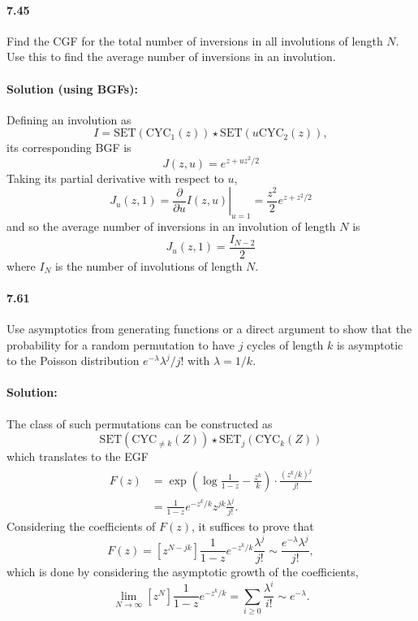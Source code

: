 \documentclass{article}
\begin{document}
\paragraph{7.45} Find the CGF for the total number of inversions in all
involutions of length $N$. Use this to find the average number of inversions in
an involution.

\paragraph{Solution (using BGFs):} Defining an involution as \begin{equation*}
  I = \mathrm{SET}(\mathrm{CYC}_1(z)) \star \mathrm{SET}(u\mathrm{CYC}_2(z)),
\end{equation*} its corresponding BGF is \begin{equation*}
  J(z, u) = e^{z + uz^2/2}
\end{equation*} Taking its partial derivative with respect to $u$,
\begin{equation*}
  J_u(z, 1) = \left.\frac{\partial}{\partial u}I(z, u)\right|_{u = 1} =
  \frac{z^2}{2} e^{z + z^2/2}
\end{equation*} and so the average number of inversions in an involution of
length $N$ is \begin{equation*}
  [z^N]J_u(z, 1) = \frac{I_{N - 2}}{2}
\end{equation*} where $I_N$ is the number of involutions of length $N$.

\paragraph{7.61} Use asymptotics from generating functions or a direct argument
to show that the probability for a random permutation to have $j$ cycles of
length $k$ is asymptotic to the Poisson distribution $e^{-\lambda}\lambda^j/j!$
with $\lambda = 1/k$.

\paragraph{Solution:} The class of such permutations can be constructed as
\begin{equation*}
  \mathrm{SET}(\mathrm{CYC}_{\neq k}(Z)) \star
  \mathrm{SET}_j(\mathrm{CYC}_k(Z))
\end{equation*} which translates to the EGF \begin{align*}
  F(z) &= \exp\left(\log\frac{1}{1 - z} - \frac{z^k}{k}\right) \cdot
  \frac{(z^k/k)^j}{j!} \\
       &= \frac{1}{1 - z}e^{-z^k/k}z^{jk}\frac{\lambda^j}{j!}.
\end{align*} Considering the coefficients of $F(z)$, it suffices to prove that
\begin{equation*}
  [z^N]F(z) = [z^{N - jk}]\frac{1}{1 - z}e^{-z^k/k}\frac{\lambda^j}{j!} \sim
  \frac{e^{-\lambda}\lambda^j}{j!},
\end{equation*} which is done by considering the asymptotic growth of the
coefficients, \begin{equation*}
  \lim_{N \rightarrow \infty} [z^N]\frac{1}{1 - z}e^{-z^k/k} =
  \sum_{i \geq 0} \frac{\lambda^i}{i!} \sim e^{-\lambda}.
\end{equation*}
\end{document}
